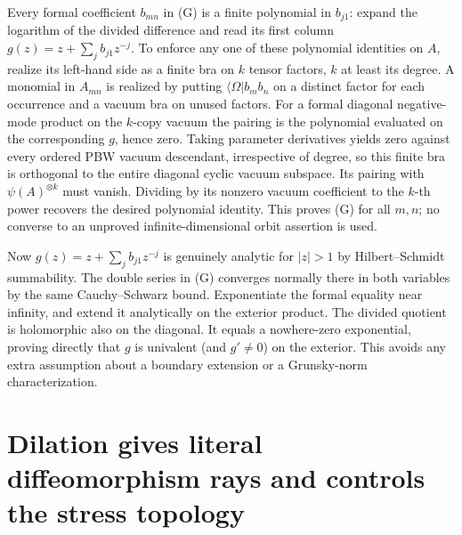 \documentclass[11pt]{article}
\begin{document}
Every formal coefficient \(b_{mn}\) in (G) is a finite polynomial in \(b_{j1}\): expand the logarithm of the divided difference and read its first column \(g(z)=z+\sum_j b_{j1} z^{-j}\). To enforce any one of these polynomial identities on \(A\), realize its left-hand side as a finite bra on \(k\) tensor factors, \(k\) at least its degree. A monomial in \(A_{mn}\) is realized by putting \(\langle\Omega|b_m b_n\) on a distinct factor for each occurrence and a vacuum bra on unused factors. For a formal diagonal negative-mode product on the \(k\)-copy vacuum the pairing is the polynomial evaluated on the corresponding \(g\), hence zero. Taking parameter derivatives yields zero against every ordered PBW vacuum descendant, irrespective of degree, so this finite bra is orthogonal to the entire diagonal cyclic vacuum subspace. Its pairing with \(\psi(A)^{\otimes k}\) must vanish. Dividing by its nonzero vacuum coefficient to the \(k\)-th power recovers the desired polynomial identity. This proves (G) for all \(m,n\); no converse to an unproved infinite-dimensional orbit assertion is used.

Now \(g(z)=z+\sum_j b_{j1} z^{-j}\) is genuinely analytic for \(|z|>1\) by Hilbert--Schmidt summability. The double series in (G) converges normally there in both variables by the same Cauchy--Schwarz bound. Exponentiate the formal equality near infinity, and extend it analytically on the exterior product. The divided quotient is holomorphic also on the diagonal. It equals a nowhere-zero exponential, proving directly that \(g\) is univalent (and \(g'\ne0\)) on the exterior. This avoids any extra assumption about a boundary extension or a Grunsky-norm characterization.

\section{Dilation gives literal diffeomorphism rays and controls the stress topology}\label{dilation-gives-literal-diffeomorphism-rays-and-controls-the-stress-topology}
\end{document}
